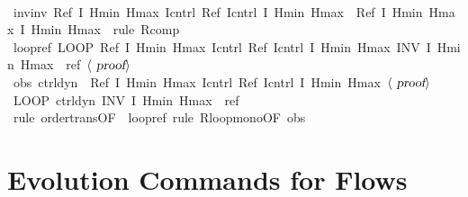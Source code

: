 \documentclass[envcountsame]{llncs}
\begin{document}
\begin{example}
\begin{isabellebody}
\ \ \isamarkupfalse%
\ inv{\isacharunderscore}inv{\isacharcolon}\ {\isachardoublequoteopen}Ref\ {\isasymlceil}I\ Hmin\ Hmax{\isasymrceil}\ {\isasymlceil}{\isacharquery}Icntrl{\isasymrceil}{\isacharsemicolon}\ {\isacharparenleft}Ref\ {\isasymlceil}{\isacharquery}Icntrl{\isasymrceil}\ {\isasymlceil}I\ Hmin\ Hmax{\isasymrceil}{\isacharparenright}\ {\isasymle}\ Ref\ {\isasymlceil}I\ Hmin\ Hmax{\isasymrceil}\ {\isasymlceil}I\ Hmin\ Hmax{\isasymrceil}{\isachardoublequoteclose}\ \isamarkupfalse\ {\isacharparenleft}rule\ R{\isacharunderscore}comp{\isacharparenright}\isanewline
\ \ \isamarkupfalse%
\ loopref{\isacharcolon}\ {\isachardoublequoteopen}LOOP\ Ref\ {\isasymlceil}I\ Hmin\ Hmax{\isasymrceil}\ {\isasymlceil}{\isacharquery}Icntrl{\isasymrceil}{\isacharsemicolon}\ {\isacharparenleft}Ref\ {\isasymlceil}{\isacharquery}Icntrl{\isasymrceil}\ {\isasymlceil}I\ Hmin\ Hmax{\isasymrceil}{\isacharparenright}\ INV\ I\ Hmin\ Hmax\ {\isasymle}\ {\isacharquery}ref{\isachardoublequoteclose}\ $\langle \isa{proof}\rangle$\isanewline
\ \ \isamarkupfalse%
\ obs{\isacharcolon}\ {\isachardoublequoteopen}{\isacharquery}ctrl{\isacharsemicolon}{\isacharquery}dyn\ {\isasymle}\ Ref\ {\isasymlceil}I\ Hmin\ Hmax{\isasymrceil}\ {\isasymlceil}{\isacharquery}Icntrl{\isasymrceil}{\isacharsemicolon}\ {\isacharparenleft}Ref\ {\isasymlceil}{\isacharquery}Icntrl{\isasymrceil}\ {\isasymlceil}I\ Hmin\ Hmax{\isasymrceil}{\isacharparenright}{\isachardoublequoteclose}\ $\langle \isa{proof}\rangle$\isanewline
\ \ \isamarkupfalse%
\ {\isachardoublequoteopen}LOOP\ {\isacharparenleft}{\isacharquery}ctrl{\isacharsemicolon}{\isacharquery}dyn{\isacharparenright}\ INV\ I\ Hmin\ Hmax\ {\isasymle}\ {\isacharquery}ref{\isachardoublequoteclose}\isanewline
\ \ \ \ \isamarkupfalse%
\ {\isacharparenleft}rule\ order{\isacharunderscore}trans{\isacharbrackleft}OF\ {\isacharunderscore}\ loopref{\isacharbrackright}{\isacharcomma}\ rule\ R{\isacharunderscore}loop{\isacharunderscore}mono{\isacharbrackleft}OF\ obs{\isacharbrackright}{\isacharparenright}\isanewline
{}
\end{isabellebody}
\end{example}


\section{Evolution Commands for Flows}\label{sec:from-flows}
\end{document}
